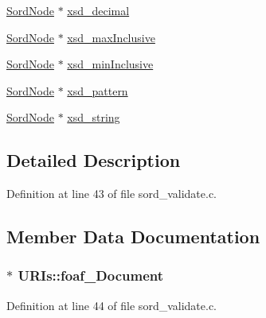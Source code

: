 \begin{DoxyCompactItemize}
\item 
\hyperlink{group__sord_ga804ac7d56d9fdea50f2d1e7278b1f82b}{Sord\+Node} $\ast$ \hyperlink{struct_u_r_is_ad5e4a3f86d9300ee688829c3ca15eb94}{xsd\+\_\+decimal}
\item 
\hyperlink{group__sord_ga804ac7d56d9fdea50f2d1e7278b1f82b}{Sord\+Node} $\ast$ \hyperlink{struct_u_r_is_a15c6968741c7ade2cfbd4b9ec06943be}{xsd\+\_\+max\+Inclusive}
\item 
\hyperlink{group__sord_ga804ac7d56d9fdea50f2d1e7278b1f82b}{Sord\+Node} $\ast$ \hyperlink{struct_u_r_is_a34195a2268597cece115bfb485a16c25}{xsd\+\_\+min\+Inclusive}
\item 
\hyperlink{group__sord_ga804ac7d56d9fdea50f2d1e7278b1f82b}{Sord\+Node} $\ast$ \hyperlink{struct_u_r_is_a82b0bf38b6fef83c25f79e6684a43084}{xsd\+\_\+pattern}
\item 
\hyperlink{group__sord_ga804ac7d56d9fdea50f2d1e7278b1f82b}{Sord\+Node} $\ast$ \hyperlink{struct_u_r_is_a7007b4ba2b000f91ae806958f3956aee}{xsd\+\_\+string}
\end{DoxyCompactItemize}


\subsection{Detailed Description}


Definition at line 43 of file sord\+\_\+validate.\+c.



\subsection{Member Data Documentation}
\subsubsection[{\texorpdfstring{foaf\+\_\+\+Document}{foaf_Document}}]{$\ast$ U\+R\+Is\+::foaf\+\_\+\+Document}\hypertarget{struct_u_r_is_ad8ec5f4fcd5f6f0815f2c56259fa6a38}{}\label{struct_u_r_is_ad8ec5f4fcd5f6f0815f2c56259fa6a38}


Definition at line 44 of file sord\+\_\+validate.\+c.

